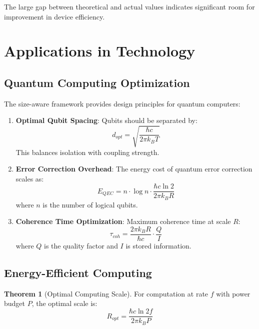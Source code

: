 \documentclass[11pt,a4paper]{article}
\theoremstyle{definition}
\newtheorem{theorem}{Theorem}[section]
\begin{document}
The large gap between theoretical and actual values indicates significant room for improvement in device efficiency.

\section{Applications in Technology}

\subsection{Quantum Computing Optimization}

The size-aware framework provides design principles for quantum computers:

\begin{enumerate}
\item \textbf{Optimal Qubit Spacing}: Qubits should be separated by:
\begin{equation}
d_{opt} = \sqrt{\frac{\hbar c}{2\pi k_B T}}
\end{equation}
This balances isolation with coupling strength.

\item \textbf{Error Correction Overhead}: The energy cost of quantum error correction scales as:
\begin{equation}
E_{QEC} = n \cdot \log n \cdot \frac{\hbar c \ln 2}{2\pi k_B R}
\end{equation}
where $n$ is the number of logical qubits.

\item \textbf{Coherence Time Optimization}: Maximum coherence time at scale $R$:
\begin{equation}
\tau_{coh} = \frac{2\pi k_B R}{\hbar c} \cdot \frac{Q}{I}
\end{equation}
where $Q$ is the quality factor and $I$ is stored information.
\end{enumerate}

\subsection{Energy-Efficient Computing}

\begin{theorem}[Optimal Computing Scale]
For computation at rate $f$ with power budget $P$, the optimal scale is:
\begin{equation}
R_{opt} = \frac{\hbar c \ln 2 f}{2\pi k_B P}
\end{equation}
\end{theorem}
\end{document}
